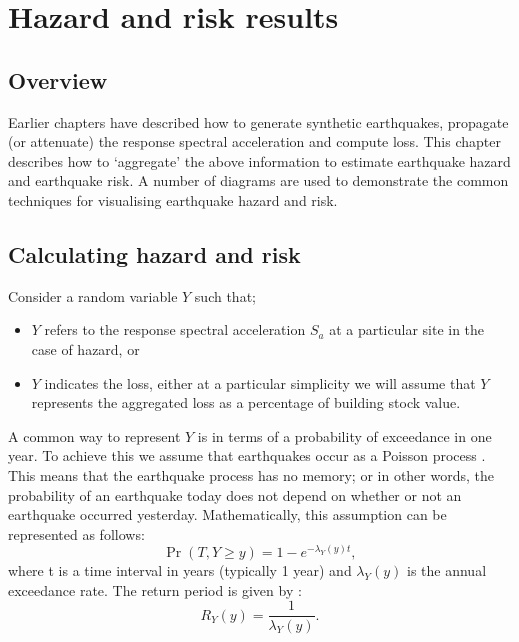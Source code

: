 \chapter{Hazard and risk results}
\label{ch:risk}


\section{Overview}

Earlier chapters have described how to generate synthetic
earthquakes, propagate (or attenuate) the response spectral
acceleration and compute
loss. This chapter describes how to `aggregate' the above
information to estimate earthquake hazard and earthquake risk. A
number of diagrams are used to demonstrate the common techniques
for visualising earthquake hazard and risk.

\section{Calculating hazard and risk}

Consider a random variable $Y$ such that; \begin{itemize} \item
$Y$ refers to the response spectral acceleration $S_a$ at a particular site in the case of
hazard, or \item $Y$ indicates the loss, either at a particular
simplicity we will assume that $Y$ represents the aggregated loss
as a percentage of building stock value.
\end{itemize}

A common way to represent $Y$ is in terms of a probability of
exceedance in one year. To achieve this we assume that
earthquakes occur as a Poisson process \citep{dr_McGuire90a}. This
means that the earthquake process has no memory; or in other
words, the probability of an earthquake today does not depend on
whether or not an earthquake occurred yesterday. Mathematically,
this assumption can be represented as follows:
\begin{equation}
 \Pr(T, Y\ge y) = 1 - e^{-\lambda_Y(y)t},
\end{equation}
where t is a time interval in years (typically 1 year) and
$\lambda_Y(y)$ is the annual exceedance rate. The return period is
given by :
\begin{equation}
\label{eq:risk-rptolambda} R_Y(y) = \frac{1}{\lambda_Y(y)}.
\end{equation}

